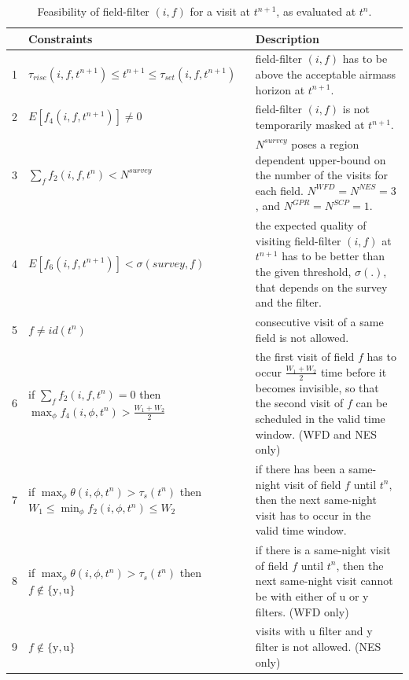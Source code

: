 \documentclass[11pt]{article}
\theoremstyle{definition}
\begin{document}
\begin{table}[h!]
\caption{Feasibility of field-filter $(i,f)$ for a visit at $t^{n+1}$, as evaluated at $t^n$.}
\begin{tabularx}{\textwidth}{| l | X | X |}
\hline
& Constraints& Description \\ \hline \hline
1&$ \tau_{rise}(i,f,t^{n+1}) \leq t^{n+1} \leq \tau_{set}(i,f,t^{n+1}) $ & field-filter $(i,f)$ has to be above the acceptable airmass horizon at $t^{n+1}.$ \\ \hline
2&$ E[f_4(i,f,t^{n+1})] \neq 0 $ & field-filter $(i,f)$ is not temporarily masked at $t^{n+1}$. \\ \hline
3 & $\sum_{f}f_2(i,f,t^n) < N^{\textit{survey}}$ & $N^{\textit{survey}}$ poses a region dependent upper-bound on the number of the visits for each field. $N^{WFD}= N^{NES} = 3$, and $N^{GPR}= N^{SCP} = 1.$ \\ \hline
4 & $E[f_6(i,f,t^{n+1})] < \sigma({\textit{survey},f})$ & the expected quality of visiting field-filter $(i,f)$ at $t^{n+1}$ has to be better than the given threshold, $\sigma(.)$, that depends on the survey and the filter. \\ \hline
5&$f \neq id(t^n)$ & consecutive visit of a same field is not allowed. \\ \hline
6& if $\sum_{f}f_2(i,f,t^n) = 0$ then \newline $\max_\phi f_4(i,\phi,t^n) > \frac{W_1+W_2}{2}$ & the first visit of field $f$ has to occur $\frac{W_1+W_2}{2}$ time before it becomes invisible, so that the second visit of $f$ can be scheduled in the valid time window.  (WFD and NES only)\\ \hline
7& if $\max_{\phi}\theta(i,\phi,t^n) > \tau_s(t^n)$ then \newline $ W_1 \leq \min_{\phi}f_2(i,\phi,t^n) \leq W_2 $& if there has been a same-night visit of field $f$ until $t^n$, then the next same-night visit has to occur in the valid time window. \\ \hline
8&if \newline $\max_{\phi}\theta(i,\phi,t^n) > \tau_s(t^n)$ then \newline $f \notin \{\text{y},\text{u}\}$ & if there is a same-night visit of field $f$ until $t^n$, then the next same-night visit cannot be with either of u or y filters. (WFD only)\\ \hline
9& $f \notin \{\text{y},\text{u}\}$ & visits with u filter and y filter is not allowed. (NES only)\\ \hline
\end{tabularx}
\end{table}\label{tab_feasibility}
\end{document}

